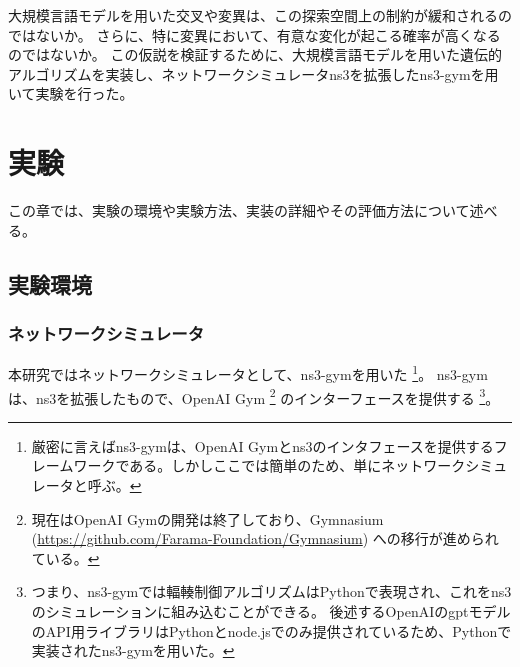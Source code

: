 \documentclass[a4paper,11pt]{jreport}
\begin{document}
大規模言語モデルを用いた交叉や変異は、この探索空間上の制約が緩和されるのではないか。
さらに、特に変異において、有意な変化が起こる確率が高くなるのではないか。
この仮説を検証するために、大規模言語モデルを用いた遺伝的アルゴリズムを実装し、ネットワークシミュレータns3\cite{ns3-2012, ns3-2010}を拡張したns3-gym\cite{ns3gym}を用いて実験を行った。

\newpage

\chapter{実験}

この章では、実験の環境や実験方法、実装の詳細やその評価方法について述べる。

\section{実験環境}

\subsection{ネットワークシミュレータ}

本研究ではネットワークシミュレータとして、ns3-gym\cite{ns3gym}を用いた
\footnote{厳密に言えばns3-gymは、OpenAI Gymとns3のインタフェースを提供するフレームワークである。しかしここでは簡単のため、単にネットワークシミュレータと呼ぶ。}。
ns3-gymは、ns3\cite{ns3-2012, ns3-2010}を拡張したもので、OpenAI Gym\cite{gym}
\footnote{現在はOpenAI Gymの開発は終了しており、Gymnasium (\url{https://github.com/Farama-Foundation/Gymnasium}) への移行が進められている。}
のインターフェースを提供する
\footnote{つまり、ns3-gymでは輻輳制御アルゴリズムはPythonで表現され、これをns3のシミュレーションに組み込むことができる。
後述するOpenAIのgptモデルのAPI用ライブラリはPythonとnode.jsでのみ提供されているため、Pythonで実装されたns3-gymを用いた。
}。
\end{document}
